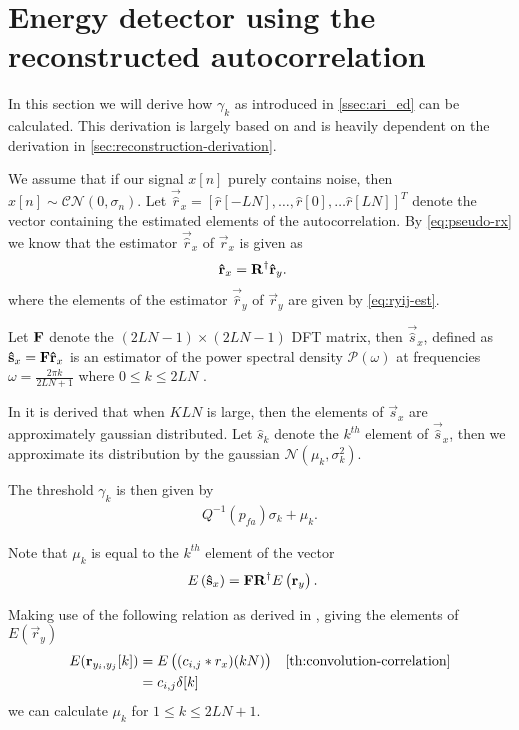 \documentclass[a4paper, openany, oneside]{memoir}
\begin{document}
\section{Energy detector using the reconstructed autocorrelation}\label{sec:ari_ed_deriv}
In this section we will derive how $\gamma_k$ as introduced in \cref{ssec:ari_ed} can be calculated. This derivation is largely based on \cite{ariananda2012compressive} and is heavily dependent on the derivation in \cref{sec:reconstruction-derivation}.

We assume that if our signal $x[n]$ purely contains noise, then $x[n] \sim \mathcal{CN}(0,\sigma_n)$. 
Let $\vec{\hat{r}}_x = [\hat{r}[-LN], \ldots, \hat{r}[0], \ldots \hat{r}[LN]]^T$ denote the vector containing the estimated elements of the autocorrelation. 
By \cref{eq:pseudo-rx} we know that the estimator $\vec{\hat{r}}_x$ of $\vec{r}_x$ is given as
\begin{align*}
\boldsymbol{\mathbf{\hat{r}}}_x &= \boldsymbol{\mathbf{R}}^{\dagger}\boldsymbol{\mathbf{\hat{r}}}_y.
\end{align*} where the elements of the estimator $\vec{\hat{r}}_y$ of $\vec{r}_y$ are given by \cref{eq:ryij-est}.

Let $\boldsymbol{\mathbf{F}}$ denote the $(2LN-1) \times (2LN-1)$ DFT matrix, then $\vec{\hat{s}}_x$, defined as
$\boldsymbol{\mathbf{\hat{s}}}_x = \boldsymbol{\mathbf{F}} \boldsymbol{\mathbf{\hat{r}}}_x$
is an estimator of the power spectral density $\mathcal{P}(\omega)$ at frequencies $\omega = \frac{2\pi k}{2LN+1}$ where $0 \leq k \leq 2LN$ .

In \cite{ariananda2012compressive} it is derived that when $KLN$ is large, then the elements of $\vec{s}_x$ are approximately gaussian distributed. Let $\hat{s}_k$ denote the $k^{th}$ element of $\vec{\hat{s}}_x$, then we approximate its distribution by the gaussian $\mathcal{N}(\mu_k, \sigma^2_k)$.

The threshold $\gamma_k$ is then given by 
\begin{align}\label{eq:ari_threshold}
Q^{-1}(p_{fa})\sigma_{k} + \mu_{k}.
\end{align}

Note that $\mu_k$ is equal to the $k^{th}$ element of the vector
\begin{align*}
E\left(\boldsymbol{\mathbf{\hat{s}}}_x\right) &= \boldsymbol{\mathbf{F}}\boldsymbol{\mathbf{R}}^{\dagger}E\left(\boldsymbol{\mathbf{r}}_y\right).
\end{align*}

Making use of the following relation as derived in \cite{ariananda2012compressive}, giving  the elements of $E(\vec{r}_y)$ 
\begin{align*}
E(\vec{r}_{y_i, y_j}[k]) &= E\left((c_{i,j} \ast r_x) (kN)\right) & \text{\cref{th:convolution-correlation}} \\
&=  c_{i,j} \delta[k]
\end{align*}
we can calculate $\mu_k$ for $1 \leq k \leq 2LN+1$.
\end{document}
